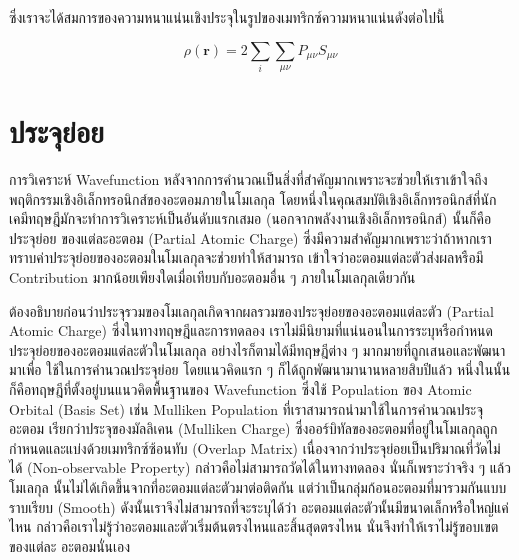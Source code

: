 \noindent ซึ่งเราจะได้สมการของความหนาแน่นเชิงประจุในรูปของเมทริกซ์ความหนาแน่นดังต่อไปนี้

\begin{equation}\label{eq:charge_density_matrix}
    \rho(\bm{r}) = 2 \sum_{i} \sum_{\mu\nu} P_{\mu\nu}S_{\mu\nu}
\end{equation}

\section{ประจุย่อย}
\label{sec:partial_charge}

การวิเคราะห์ Wavefunction หลังจากการคำนวณเป็นสิ่งที่สำคัญมากเพราะจะช่วยให้เราเข้าใจถึงพฤติกรรมเชิงอิเล็กทรอนิกส์ของอะตอมภายในโมเลกุล
โดยหนึ่งในคุณสมบัติเชิงอิเล็กทรอนิกส์ที่นักเคมีทฤษฎีมักจะทำการวิเคราะห์เป็นอันดับแรกเสมอ (นอกจากพลังงานเชิงอิเล็กทรอนิกส์) นั้นก็คือประจุย่อย%
ของแต่ละอะตอม (Partial Atomic Charge) ซึ่งมีความสำคัญมากเพราะว่าถ้าหากเราทราบค่าประจุย่อยของอะตอมในโมเลกุลจะช่วยทำให้สามารถ%
เข้าใจว่าอะตอมแต่ละตัวส่งผลหรือมี Contribution มากน้อยเพียงใดเมื่อเทียบกับอะตอมอื่น ๆ ภายในโมเลกุลเดียวกัน

ต้องอธิบายก่อนว่าประจุรวมของโมเลกุลเกิดจากผลรวมของประจุย่อยของอะตอมแต่ละตัว (Partial Atomic Charge) ซึ่งในทางทฤษฎีและการทดลอง%
เราไม่มีนิยามที่แน่นอนในการระบุหรือกำหนดประจุย่อยของอะตอมแต่ละตัวในโมเลกุล อย่างไรก็ตามได้มีทฤษฎีต่าง ๆ มากมายที่ถูกเสนอและพัฒนามาเพื่อ%
ใช้ในการคำนวณประจุย่อย โดยแนวคิดแรก ๆ ก็ได้ถูกพัฒนามานานหลายสิบปีแล้ว หนึ่งในนั้นก็คือทฤษฎีที่ตั้งอยู่บนแนวคิดพื้นฐานของ Wavefunction
ซึ่งใช้ Population ของ Atomic Orbital (Basis Set) เช่น Mulliken Population ที่เราสามารถนำมาใช้ในการคำนวณประจุอะตอม
เรียกว่าประจุของมัลลิเคน (Mulliken Charge) ซึ่งออร์บิทัลของอะตอมที่อยู่ในโมเลกุลถูกกำหนดและแบ่งด้วยเมทริกซ์ซ้อนทับ (Overlap Matrix)
เนื่องจากว่าประจุย่อยเป็นปริมาณที่วัดไม่ได้ (Non-observable Property) กล่าวคือไม่สามารถวัดได้ในทางทดลอง นั่นก็เพราะว่าจริง ๆ แล้วโมเลกุล%
นั้นไม่ได้เกิดขึ้นจากที่อะตอมแต่ละตัวมาต่อติดกัน แต่ว่าเป็นกลุ่มก้อนอะตอมที่มารวมกันแบบราบเรียบ (Smooth) ดังนั้นเราจึงไม่สามารถที่จะระบุได้ว่า%
อะตอมแต่ละตัวนั้นมีขนาดเล็กหรือใหญ่แค่ไหน กล่าวคือเราไม่รู้ว่าอะตอมและตัวเริ่มต้นตรงไหนและสิ้นสุดตรงไหน นั่นจึงทำให้เราไม่รู้ขอบเขตของแต่ละ%
อะตอมนั่นเอง

